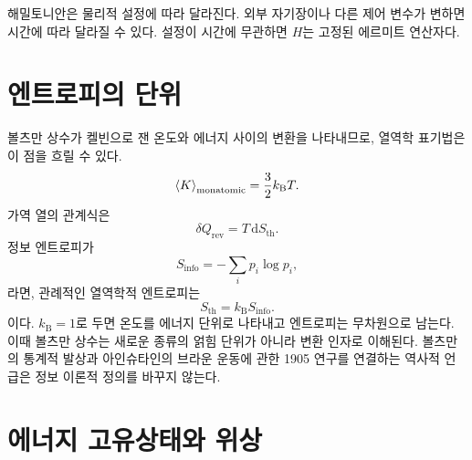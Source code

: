해밀토니안은 물리적 설정에 따라 달라진다. 외부 자기장이나 다른 제어 변수가 변하면 시간에 따라 달라질 수 있다. 설정이 시간에 무관하면 \(H\)는 고정된 에르미트 연산자다.

\begin{classroomqa}
\end{classroomqa}

\section{엔트로피의 단위}

\begin{classroomqa}
\end{classroomqa}

볼츠만 상수가 켈빈으로 잰 온도와 에너지 사이의 변환을 나타내므로, 열역학 표기법은 이 점을 흐릴 수 있다.
\begin{equation}
\left\langle K\right\rangle_{\mathrm{monatomic}}
=\frac32 k_{\mathrm B}T.
\end{equation}
가역 열의 관계식은
\begin{equation}
\delta Q_{\mathrm{rev}}=T\,\mathrm dS_{\mathrm{th}}.
\end{equation}
정보 엔트로피가
\begin{equation}
S_{\mathrm{info}}=-\sum_i p_i\log p_i,
\end{equation}
라면, 관례적인 열역학적 엔트로피는
\begin{equation}
S_{\mathrm{th}}=k_{\mathrm B}S_{\mathrm{info}}.
\end{equation}
이다. \(k_{\mathrm B}=1\)로 두면 온도를 에너지 단위로 나타내고 엔트로피는 무차원으로 남는다. 이때 볼츠만 상수는 새로운 종류의 얽힘 단위가 아니라 변환 인자로 이해된다. 볼츠만의 통계적 발상과 아인슈타인의 브라운 운동에 관한 1905 연구를 연결하는 역사적 언급은 정보 이론적 정의를 바꾸지 않는다.

\section{에너지 고유상태와 위상}

